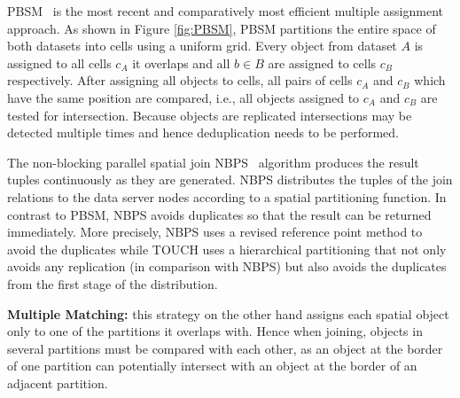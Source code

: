 \documentclass{vldb}
\newcommand{\fref}[1]{Figure \ref{#1}}
\begin{document}
PBSM~\cite{join:PBSM} is the most recent and comparatively most efficient multiple assignment approach. As shown in \fref{fig:PBSM}, PBSM partitions the entire
space of both datasets into cells using a uniform grid. Every object from dataset $A$ is assigned to all cells $c_A$ it overlaps and all $b \in B$ are assigned
to cells $c_B$ respectively. After assigning all objects to cells, all pairs of cells $c_A$ and $c_B$ which have the same position are compared, i.e., all
objects assigned to $c_A$ and $c_B$ are tested for intersection. Because objects are replicated intersections may be detected multiple times and hence
deduplication needs to be performed.


The non-blocking parallel spatial join NBPS~\cite{join:nonblocking} algorithm produces the result tuples continuously as they are generated. NBPS distributes the tuples of the join relations to the data server nodes according to a spatial partitioning function. In contrast to PBSM, NBPS avoids duplicates so that the result can  be returned immediately. More precisely, NBPS uses a revised reference point method to avoid the duplicates while TOUCH uses a hierarchical partitioning that not only avoids any replication (in comparison with NBPS) but also avoids the duplicates from the first stage of the distribution.



\noindent\textbf{Multiple Matching:} this strategy on the other hand assigns each spatial object only to one of the partitions it overlaps with. Hence when
joining, objects in several partitions must be compared with each other, as an object at the border of one partition can potentially intersect with an object at
the border of an adjacent partition.
\end{document}
